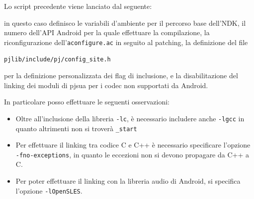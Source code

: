 \begin{algorithm}[thp]

\end{algorithm}

Lo script precedente viene lanciato dal seguente:

in questo caso definisco le variabili d'ambiente per  il percorso base
dell'NDK, il numero dell'API Android per la quale effettuare la compilazione,
la riconfigurazione dell'\texttt{\small aconfigure.ac} in seguito al patching,
la definizione del file
\begin{center}
\texttt{\small pjlib/include/pj/config\_site.h}
\end{center}
per la definizione personalizzata dei flag di inclusione, e la disabilitazione
del linking dei moduli di pjsua per i codec non supportati da Android.

In particolare posso effettuare le seguenti osservazioni:
\begin{itemize}
\item Oltre all'inclusione della libreria \texttt{\small -lc}, è necessario includere
	anche \texttt{\small -lgcc} in quanto altrimenti non si troverà \texttt{\small\_start}
\item Per effettuare il linking tra codice C e C++ è necessario specificare
	l'opzione \texttt{\small -fno-exceptions}, in quanto le eccezioni non si
	devono propagare da C++ a C.
\item Per poter effettuare il linking con la libreria audio di Android, si specifica
	l'opzione \texttt{\small -lOpenSLES}.
\end{itemize}
